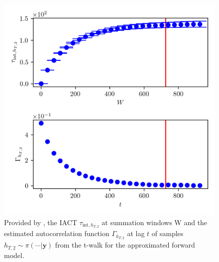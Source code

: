 \begin{figure}[ht!]
	\centering
	\includegraphics{UwerrTauIntTWalk8.png}
	\caption[IACT and autocorrelation function of samples $h_{T,2} \sim \pi(\cdot|\bm{y})$, for approximated model.]{Provided by \cite{drikHesse}, the IACT $\tau_{\text{int},h_{T,2}}$ at summation windows W and the estimated autocorrelation function $\Gamma_{h_{T,2}}$ at lag $t$ of samples $h_{T,2} \sim \pi( \cdots | \bm{y})$ from the t-walk for the approximated forward model.}
	\label{fig:TWalkIATC9}
\end{figure}


